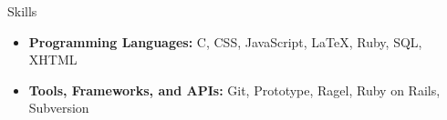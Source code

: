 \documentclass[11pt,oneside]{article}
\newenvironment{ressection}[1]{
	\vspace{2pt}
	{\selectfont\Large#1}
	\begin{itemize}
	\vspace{3pt}
}{
	\end{itemize}
}
\newcommand{\resitem}[1]{
	\vspace{-4pt}
	\item \begin{flushleft} #1 \end{flushleft}
}
\begin{document}
\begin{ressection}{Skills}

	
	\resitem{{\bfseries Programming Languages:} C, CSS, JavaScript, \LaTeX, Ruby, SQL, XHTML}
	
	\resitem{{\bfseries Tools, Frameworks, and APIs:} Git, Prototype, Ragel, Ruby on Rails, Subversion}

\end{ressection}

%
\end{document}
